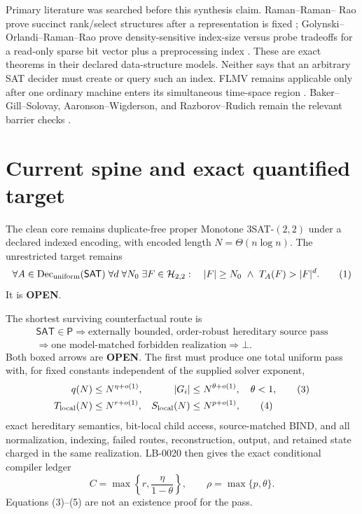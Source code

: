 \documentclass[11pt]{article}
\newcommand{\SAT}{\mathsf{SAT}}
\newcommand{\Pclass}{\mathsf P}
\newcommand{\OPEN}{\textbf{OPEN}}
\begin{document}
Primary literature was searched before this synthesis claim.  Raman--Raman--
Rao prove succinct rank/select structures after a representation is fixed
\cite{RRR07}; Golynski--Orlandi--Raman--Rao prove density-sensitive index-size
versus probe tradeoffs for a read-only sparse bit vector plus a preprocessing
index \cite{GORR11}.  These are exact theorems in their declared data-structure
models.  Neither says that an arbitrary SAT decider must create or query such
an index.  FLMV remains applicable only after one ordinary machine enters its
simultaneous time-space region \cite{FLMV05}.  Baker--Gill--Solovay,
Aaronson--Wigderson, and Razborov--Rudich remain the relevant barrier checks
\cite{BGS75,AW09,RR97}.

\section{Current spine and exact quantified target}

The clean core remains duplicate-free proper Monotone $3$SAT-$(2,2)$ under a
declared indexed encoding, with encoded length $N=\Theta(n\log n)$.  The
unrestricted target remains
\begin{equation}
 \forall A\in\operatorname{Dec}_{\rm uniform}(\SAT)\;
 \forall d\;\forall N_0\;\exists F\in\mathcal H_{2,2}:\quad
 |F|\ge N_0\ \land\ T_A(F)>|F|^d.                              \tag{1}
\end{equation}
It is \OPEN.

The shortest surviving counterfactual route is
\begin{equation}
\begin{gathered}
 \SAT\in\Pclass
 \Longrightarrow
 \boxed{\text{externally bounded, order-robust hereditary source pass}}\\
 \Longrightarrow
 \boxed{\text{one model-matched forbidden realization}}
 \Longrightarrow\bot .
\end{gathered}                                                  \tag{2}
\end{equation}
Both boxed arrows are \OPEN.  The first must produce one total uniform pass
with, for fixed constants independent of the supplied solver exponent,
\begin{align}
 q(N)&\le N^{\eta+o(1)}, & |G_i|&\le N^{\theta+o(1)},\quad\theta<1,\tag{3}\\
 T_{\rm local}(N)&\le N^{r+o(1)}, & S_{\rm local}(N)&\le N^{p+o(1)},            \tag{4}
\end{align}
exact hereditary semantics, bit-local child access, source-matched BIND,
and all normalization, indexing, failed routes, reconstruction, output, and
retained state charged in the same realization.  LB-0020 then gives the exact
conditional compiler ledger
\begin{equation}
 C=\max\left\{r,\frac{\eta}{1-\theta}\right\},
 \qquad \rho=\max\{p,\theta\}.                                 \tag{5}
\end{equation}
Equations (3)--(5) are not an existence proof for the pass.
\end{document}
